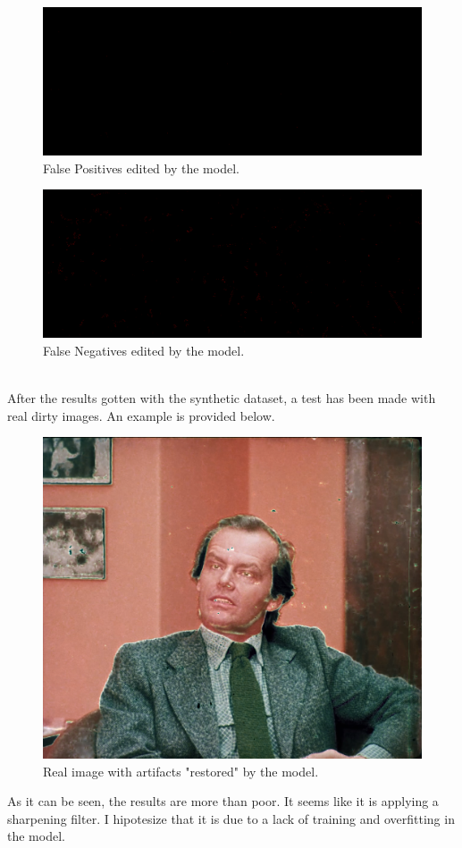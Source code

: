 \documentclass[openany, 12pt]{article}
\begin{document}
\begin{figure}[h!]
	\centering
	\includegraphics[width=0.8\linewidth]{./images/totoro_FP.png}
	\caption{\smaller False Positives edited by the model.} 
\end{figure}
\begin{figure}[h!]
	\centering
	\includegraphics[width=0.65\linewidth]{./images/totoro_FN.png}
	\caption{\smaller False Negatives edited by the model.} 
\end{figure}
\\After the results gotten with the synthetic dataset, a test has been made with real dirty images. An example is provided below.
\begin{figure}[h!]
	\centering
	\includegraphics[width=0.8\linewidth]{./images/image_result.png}
	\caption{\smaller Real image with artifacts "restored" by the model.} 
\end{figure}As it can be seen, the results are more than poor. It seems like it is applying a sharpening filter. I hipotesize that it is due to a lack of training and overfitting in the model. 
\end{document}
